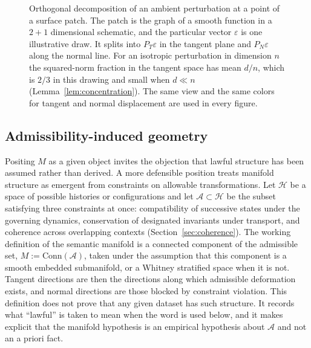 \documentclass[11pt,a4paper]{article}
\theoremstyle{definition}
\theoremstyle{remark}
\newcommand{\TM}[1]{T_{#1}M}
\newcommand{\NM}[1]{N_{#1}M}
\begin{document}
\begin{figure}[ht]
\caption{Orthogonal decomposition of an ambient perturbation at a point of a
surface patch. The patch is the graph of a smooth function in a
$2+1$ dimensional schematic, and the particular vector $\varepsilon$ is one
illustrative draw. It splits into $P_T\varepsilon$ in the tangent plane and
$P_N\varepsilon$ along the normal line. For an isotropic perturbation in
dimension $n$ the squared-norm fraction in the tangent space has mean $d/n$,
which is $2/3$ in this drawing and small when $d\ll n$
(Lemma~\ref{lem:concentration}). The same view and the same colors for
tangent and normal displacement are used in every figure.}
\label{fig:decomposition}
\end{figure}

\subsection{Admissibility-induced geometry}

Positing $M$ as a given object invites the objection that lawful
structure has been assumed rather than derived. A more defensible
position treats manifold structure as emergent from constraints on
allowable transformations. Let $\mathcal{H}$ be a space of possible
histories or configurations and let $\mathcal{A}\subset\mathcal{H}$ be the
subset satisfying three constraints at once: compatibility of successive
states under the governing dynamics, conservation of designated
invariants under transport, and coherence across overlapping contexts
(Section~\ref{sec:coherence}). The working definition of the semantic
manifold is a connected component of the admissible set,
$M:=\mathrm{Conn}(\mathcal{A})$, taken under the assumption that this
component is a smooth embedded submanifold, or a Whitney stratified space
when it is not. Tangent directions are then the directions along which
admissible deformation exists, and normal directions are those blocked by
constraint violation. This definition does not prove that any given
dataset has such structure. It records what ``lawful'' is taken to mean
when the word is used below, and it makes explicit that the manifold
hypothesis is an empirical hypothesis about $\mathcal{A}$ and not an
a priori fact.
\end{document}
